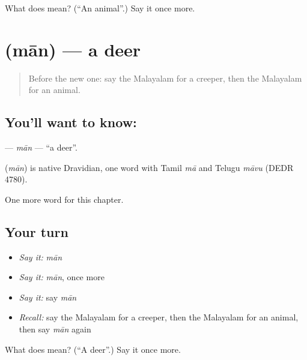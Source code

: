 \begin{tcolorbox}[breakable,colback=teal!4,colframe=teal!35!black,title={Before you move on}]
What does  mean? (\textquotedblleft{}An animal\textquotedblright{}.) Say it once more.
\end{tcolorbox}
\section[\texorpdfstring{\ml{മാൻ} (mān)}{മാൻ (mān)}]{ (mān) — a deer}

\label{lesson:ML-C291-man}



\begin{quote}
Before the new one: say the Malayalam for a creeper, then the Malayalam for an animal.
\end{quote}

\subsection*{You'll want to know: }
\textbf{} — \emph{mān} — \textquotedblleft{}a deer\textquotedblright{}.

\begin{cousinweb}
\textbf{} (\emph{mān}) is native Dravidian, one word with Tamil \emph{mā} and Telugu \emph{māvu} (DEDR 4780).
\end{cousinweb}

\begin{grammarlens}[title={What you've built}]
One more word for this chapter.
\end{grammarlens}

\subsection*{Your turn}
\begin{itemize}
\raggedright
  \item \emph{Say it:} \emph{mān}
  \item \emph{Say it:} \emph{mān}, once more
  \item \emph{Say it:} say \emph{mān}
  \item \emph{Recall:} say the Malayalam for a creeper, then the Malayalam for an animal, then say \emph{mān} again
\end{itemize}

\begin{tcolorbox}[breakable,colback=teal!4,colframe=teal!35!black,title={Before you move on}]
What does  mean? (\textquotedblleft{}A deer\textquotedblright{}.) Say it once more.
\end{tcolorbox}
